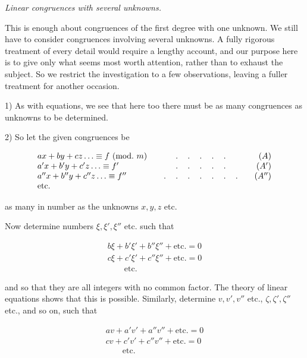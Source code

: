 \begin{center}\emph{Linear congruences with several unknowns.}\end{center}


This is enough about congruences of the first degree with one unknown. We still have to consider congruences involving several unknowns. A fully rigorous treatment of every detail would require a lengthy account, and our purpose here is to give only what seems most worth attention, rather than to exhaust the subject. So we restrict the investigation to a few observations, leaving a fuller treatment for another occasion.

1) As with equations, we see that here too there must be as many congruences as unknowns to be determined.

2) So let the given congruences be

\[
\begin{array}{l@{\qquad}c@{\qquad}r}
ax+by+cz\ldots\equiv f\ (\mathrm{mod.}\ m)&\ldotp\quad\ldotp\quad\ldotp\quad\ldotp\quad\ldotp&(A)\\
a'x+b'y+c'z\ldots\equiv f'&\ldotp\quad\ldotp\quad\ldotp\quad\ldotp\quad\ldotp&(A')\\
a''x+b''y+c''z\ldots\equiv f''&\ldotp\quad\ldotp\quad\ldotp\quad\ldotp\quad\ldotp\quad\ldotp\quad\ldotp&(A'')\\
\mathrm{etc.}&&
\end{array}
\]

as many in number as the unknowns $x,y,z$ etc.

Now determine numbers $\xi,\xi',\xi''$ etc. such that

\[\begin{array}{l}
b\xi+b'\xi'+b''\xi''+\mathrm{etc.}=0\\
c\xi+c'\xi'+c''\xi''+\mathrm{etc.}=0\\
\qquad\mathrm{etc.}
\end{array}\]

and so that they are all integers with no common factor. The theory of linear equations shows that this is possible. Similarly, determine $v,v',v''$ etc., $\zeta,\zeta',\zeta''$ etc., and so on, such that

\[
\begin{array}{l}av+a'v'+a''v''+\mathrm{etc.}=0\\cv+c'v'+c''v''+\mathrm{etc.}=0\\\qquad\mathrm{etc.}\end{array}
\]

